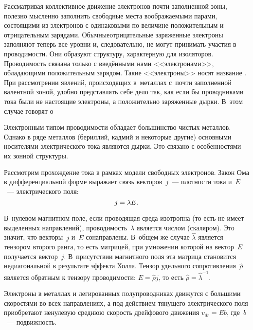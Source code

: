 Рассматривая коллективное движение электронов почти заполненной зоны, полезно
мысленно заполнить свободные места
воображаемыми парами, состоящими из электронов с одинаковыми по величине
положительным и отрицательным зарядами. Обычныеотрицательные заряженные
электроны заполняют теперь все уровни и, следовательно, не могут принимать
участия в проводимости. Они образуют структуру, характерную для изоляторов.
Проводимость связана только с введёнными нами
<<электронами>>, обладающими положительным зарядом. Такие <<электроны>> носят
название . При рассмотрении явлений, происходящих в~металлах
с~почти заполненной валентной зоной, удобно представлять себе дело так, как если
бы проводниками тока были не настоящие электроны, а положительно заряженные
дырки. В~этом случае говорят о 

Электронным типом проводимости обладает большинство чистых металлов. Однако в
ряде металлов (бериллий, кадмий и
некоторые другие) основными носителями электрического тока являются дырки. Это
связано с особенностями их зонной
структуры.


Рассмотрим прохождение тока в рамках модели свободных электронов.
Закон Ома в дифференциальной форме выражает связь векторов~$j$~--- плотности тока
и~$E$~--- электрического поля:
\begin{equation}
	j=\lambda E.
	\eqmark{3.16}
\end{equation}

В~нулевом магнитном поле, если проводящая среда изотропна (то есть не имеет
выделенных направлений), проводимость~$\lambda$ является числом (скаляром). Это
значит, что векторы~$j$ и~$E$ сонаправлены. В~общем же случае
$\widehat{\lambda}$ является тензором второго ранга, то есть матрицей, при
умножении которой на вектор~$E$ получается вектор~$j$. В~присутствии магнитного
поля эта матрица становится недиагональной в результате эффекта Холла. Тензор
удельного сопротивления~$\widehat{\rho}$ является обратным к тензору
проводимости: $E=\widehat{\rho}j$, то есть
$\widehat{\rho}=\widehat{\lambda}^{-1}$.

Электроны в металлах и легированных полупроводниках движутся с большими
скоростями во всех направлениях, а под действием тянущего
электрического поля приобретают ненулевую среднюю скорость дрейфового движения
$v_{dr}=  Eb$, где~$b$~--- подвижность.

